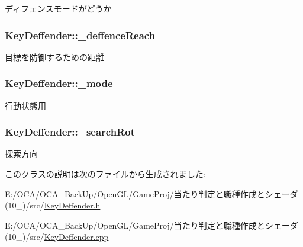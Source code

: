 ディフェンスモードがどうか 

\hypertarget{class_key_deffender_a707f63b922b484c455d715d9aee813e9}{
\subsubsection[{\-\_\-deffence\-Reach}]{ Key\-Deffender\-::\-\_\-deffence\-Reach\hspace{0.3cm}{\ttfamily [protected]}}}\label{class_key_deffender_a707f63b922b484c455d715d9aee813e9}


目標を防御するための距離 

\hypertarget{class_key_deffender_ab95b209ff1600e6425422d644c05ffb7}{
\subsubsection[{\-\_\-mode}]{ Key\-Deffender\-::\-\_\-mode\hspace{0.3cm}{\ttfamily [protected]}}}\label{class_key_deffender_ab95b209ff1600e6425422d644c05ffb7}


行動状態用 

\hypertarget{class_key_deffender_acb50cc4c7f821904eb07c27de131cf4a}{
\subsubsection[{\-\_\-search\-Rot}]{ Key\-Deffender\-::\-\_\-search\-Rot\hspace{0.3cm}{\ttfamily [protected]}}}\label{class_key_deffender_acb50cc4c7f821904eb07c27de131cf4a}


探索方向 



このクラスの説明は次のファイルから生成されました\-:\begin{DoxyCompactItemize}
\item 
E\-:/\-O\-C\-A/\-O\-C\-A\-\_\-\-Back\-Up/\-Open\-G\-L/\-Game\-Proj/当たり判定と職種作成とシェーダ(10\-\_)/src/\hyperlink{_key_deffender_8h}{Key\-Deffender.\-h}\item 
E\-:/\-O\-C\-A/\-O\-C\-A\-\_\-\-Back\-Up/\-Open\-G\-L/\-Game\-Proj/当たり判定と職種作成とシェーダ(10\-\_)/src/\hyperlink{_key_deffender_8cpp}{Key\-Deffender.\-cpp}\end{DoxyCompactItemize}
